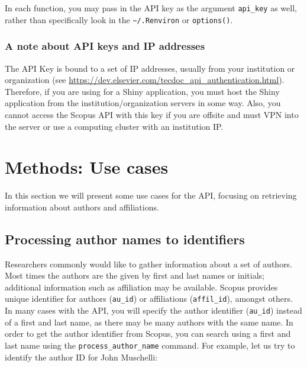 In each function, you may pass in the API key as the argument
\texttt{api\_key} as well, rather than specifically look in the
\texttt{\textasciitilde{}/.Renviron} or \texttt{options()}.

\hypertarget{a-note-about-api-keys-and-ip-addresses}{%
\subsubsection{A note about API keys and IP
addresses}\label{a-note-about-api-keys-and-ip-addresses}}

The API Key is bound to a set of IP addresses, usually from your
institution or organization (see
\url{https://dev.elsevier.com/tecdoc_api_authentication.html}).
Therefore, if you are using  for a Shiny application, you
must host the Shiny application from the institution/organization
servers in some way. Also, you cannot access the Scopus API with this
key if you are offsite and must VPN into the server or use a computing
cluster with an institution IP.

\hypertarget{methods-use-cases}{%
\section{Methods: Use cases}\label{methods-use-cases}}

In this section we will present some use cases for the API, focusing on
retrieving information about authors and affiliations.

\hypertarget{processing-author-names-to-identifiers}{%
\subsection{Processing author names to
identifiers}\label{processing-author-names-to-identifiers}}

Researchers commonly would like to gather information about a set of
authors. Most times the authors are the given by first and last names or
initials; additional information such as affiliation may be available.
Scopus provides unique identifier for authors (\texttt{au\_id}) or
affiliations (\texttt{affil\_id}), amongst others. In many cases with
the API, you will specify the author identifier (\texttt{au\_id})
instead of a first and last name, as there may be many authors with the
same name. In order to get the author identifier from Scopus, you can
search using a first and last name using the
\texttt{process\_author\_name} command. For example, let us try to
identify the author ID for John Muschelli:

